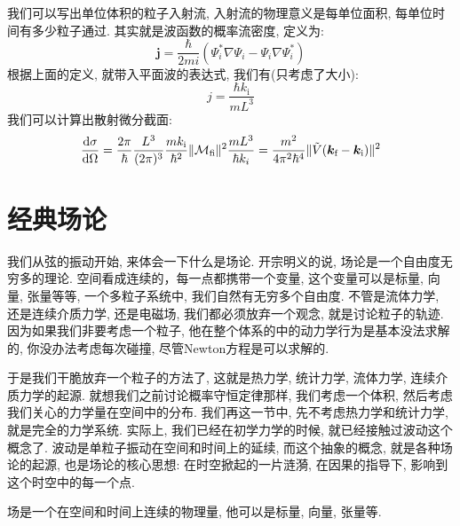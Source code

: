 我们可以写出单位体积的粒子入射流, 入射流的物理意义是每单位面积, 每单位时间有多少粒子通过.
其实就是波函数的概率流密度, 定义为:
\begin{equation}
  \bm{j}=\frac{\hbar}{2 m i}\left(\Psi_i^* \nabla \Psi_i-\Psi_i \nabla \Psi_i^*\right)
\end{equation}
根据上面的定义, 就带入平面波的表达式, 我们有(只考虑了大小):
\begin{equation}
  j = \frac{\hbar k_{\text{i}}}{mL^3}
\end{equation}
我们可以计算出散射微分截面:
\begin{equation}
  \dv{\sigma}{\Omega} = \frac{2\pi}{\hbar} \frac{L^3}{(2\pi)^3} \frac{m k_{\text{i}}}{\hbar^2} \|\mathcal{M}_{\text{fi}}\|^2 \frac{m L^3}{\hbar k_i} = \frac{m^2}{4\pi^2 \hbar^4} \|\tilde{V}(\bm{k}_{\text{f}} - \bm{k}_{\text{i}})\|^2
\end{equation}


\newpage
\section{经典场论}
\label{CH1 S6 Classical field theory}
我们从弦的振动开始, 来体会一下什么是场论.
开宗明义的说, 场论是一个自由度无穷多的理论.
空间看成连续的，每一点都携带一个变量, 这个变量可以是标量, 向量, 张量等等, 一个多粒子系统中, 我们自然有无穷多个自由度.
不管是流体力学, 还是连续介质力学, 还是电磁场, 我们都必须放弃一个观念, 就是讨论粒子的轨迹.
因为如果我们非要考虑一个粒子, 他在整个体系的中的动力学行为是基本没法求解的, 你没办法考虑每次碰撞, 尽管Newton方程是可以求解的.


于是我们干脆放弃一个粒子的方法了, 这就是热力学, 统计力学, 流体力学, 连续介质力学的起源.
就想我们之前讨论概率守恒定律那样, 我们考虑一个体积, 然后考虑我们关心的力学量在空间中的分布.
我们再这一节中, 先不考虑热力学和统计力学, 就是完全的力学系统.
实际上, 我们已经在初学力学的时候, 就已经接触过波动这个概念了.
波动是单粒子振动在空间和时间上的延续, 而这个抽象的概念, 就是各种场论的起源, 也是场论的核心思想: 在时空掀起的一片涟漪, 在因果的指导下, 影响到这个时空中的每一个点.
\begin{definition}[][场]
  场是一个在空间和时间上连续的物理量, 他可以是标量, 向量, 张量等.
\end{definition}


